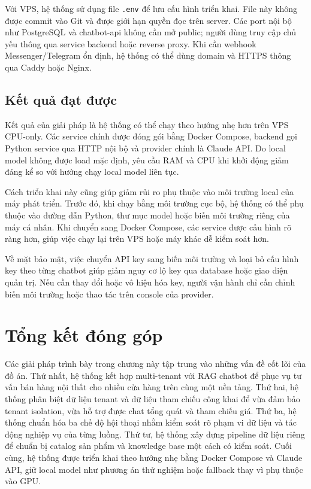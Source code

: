 \documentclass[../DoAn.tex]{subfiles}
\begin{document}
Với VPS, hệ thống sử dụng file \texttt{.env} để lưu cấu hình triển khai. File này không được commit vào Git và được giới hạn quyền đọc trên server. Các port nội bộ như PostgreSQL và chatbot-api không cần mở public; người dùng truy cập chủ yếu thông qua service backend hoặc reverse proxy. Khi cần webhook Messenger/Telegram ổn định, hệ thống có thể dùng domain và HTTPS thông qua Caddy hoặc Nginx.

\subsection{Kết quả đạt được}
\label{subsection:5.5.3}

Kết quả của giải pháp là hệ thống có thể chạy theo hướng nhẹ hơn trên VPS CPU-only. Các service chính được đóng gói bằng Docker Compose, backend gọi Python service qua HTTP nội bộ và provider chính là Claude API. Do local model không được load mặc định, yêu cầu RAM và CPU khi khởi động giảm đáng kể so với hướng chạy local model liên tục.

Cách triển khai này cũng giúp giảm rủi ro phụ thuộc vào môi trường local của máy phát triển. Trước đó, khi chạy bằng môi trường cục bộ, hệ thống có thể phụ thuộc vào đường dẫn Python, thư mục model hoặc biến môi trường riêng của máy cá nhân. Khi chuyển sang Docker Compose, các service được cấu hình rõ ràng hơn, giúp việc chạy lại trên VPS hoặc máy khác dễ kiểm soát hơn.

Về mặt bảo mật, việc chuyển API key sang biến môi trường và loại bỏ cấu hình key theo từng chatbot giúp giảm nguy cơ lộ key qua database hoặc giao diện quản trị. Nếu cần thay đổi hoặc vô hiệu hóa key, người vận hành chỉ cần chỉnh biến môi trường hoặc thao tác trên console của provider.


\section{Tổng kết đóng góp}
\label{section:5.6}

Các giải pháp trình bày trong chương này tập trung vào những vấn đề cốt lõi của đồ án. Thứ nhất, hệ thống kết hợp multi-tenant với RAG chatbot để phục vụ tư vấn bán hàng nội thất cho nhiều cửa hàng trên cùng một nền tảng. Thứ hai, hệ thống phân biệt dữ liệu tenant và dữ liệu tham chiếu công khai để vừa đảm bảo tenant isolation, vừa hỗ trợ được chat tổng quát và tham chiếu giá. Thứ ba, hệ thống chuẩn hóa ba chế độ hội thoại nhằm kiểm soát rõ phạm vi dữ liệu và tác động nghiệp vụ của từng luồng. Thứ tư, hệ thống xây dựng pipeline dữ liệu riêng để chuẩn bị catalog sản phẩm và knowledge base một cách có kiểm soát. Cuối cùng, hệ thống được triển khai theo hướng nhẹ bằng Docker Compose và Claude API, giữ local model như phương án thử nghiệm hoặc fallback thay vì phụ thuộc vào GPU.
\end{document}
